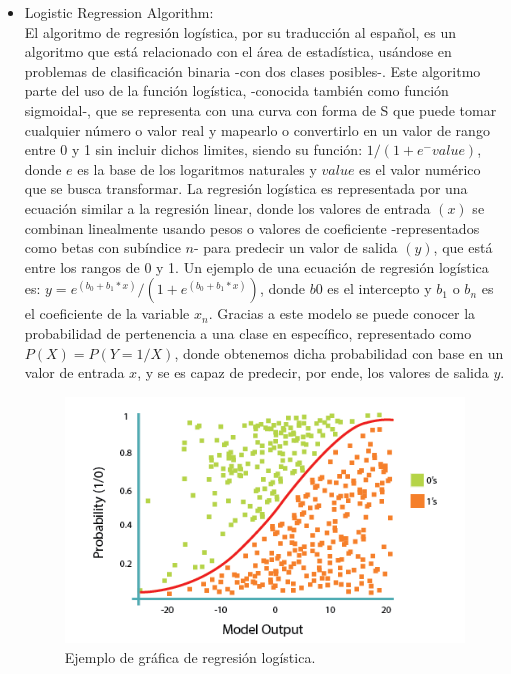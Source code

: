 \documentclass[runningheads]{llncs}
\begin{document}
\begin{itemize}
    \item Logistic Regression Algorithm:\\
    El algoritmo de regresión logística, por su traducción al español, es un algoritmo que está relacionado con el área de estadística, usándose en problemas de clasificación binaria -con dos clases posibles-. Este algoritmo parte del uso de la función logística, -conocida también como función sigmoidal-, que se representa con una curva con forma de S que puede tomar cualquier número o valor real y mapearlo o convertirlo en un valor de rango entre 0 y 1 sin incluir dichos limites, siendo su función: $1 / (1 + e^-value)$, donde $e$ es la base de los logaritmos naturales y $value$ es el valor numérico que se busca transformar.
    La regresión logística es representada por una ecuación similar a la regresión linear, donde los valores de entrada $(x)$ se combinan linealmente usando pesos o valores de coeficiente -representados como betas con subíndice $n$- para predecir un valor de salida $(y)$, que está entre los rangos de 0 y 1. Un ejemplo de una ecuación de regresión logística es: $y = e^(b_0 + b_1*x) / (1 + e^(b_0 + b_1*x))$, donde $b0$ es el intercepto y $b_1$ o $b_n$ es el coeficiente de la variable $x_n$. Gracias a este modelo se puede conocer la probabilidad de pertenencia a una clase en específico, representado como $P(X) = P(Y=1/X)$, donde obtenemos dicha probabilidad con base en un valor de entrada $x$, y se es capaz de predecir, por ende, los valores de salida $y$.
    
    \begin{figure}
        \centering
        \includegraphics[width=0.8\columnwidth]{Regresion_Logistica.png}
        \caption{Ejemplo de gráfica de regresión logística.}
        \label{fig:comand}%
    \end{figure}
    
    \newpage
    

\end{itemize}
\end{document}
